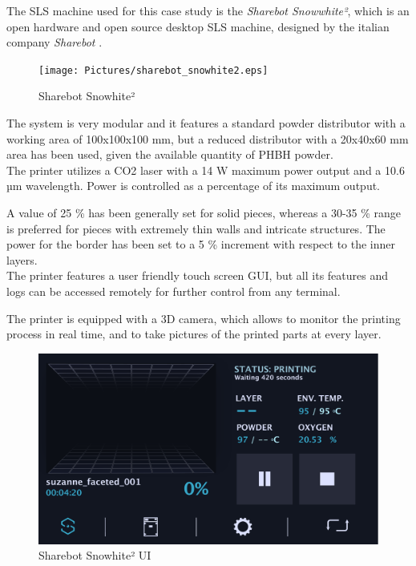 \documentclass{article}
\begin{document}
        The SLS machine used for this case study is the \textit{Sharebot Snowwhite²}, which is an open hardware and 
        open source desktop SLS machine, designed by the italian company \textit{Sharebot} \autocites{Sharebot}. \\ 

        \begin{figure}[h!]
            \centering
            \texttt{[image: Pictures/sharebot\_snowhite2.eps]}
            \caption{Sharebot Snowhite²}
            \label{fig:Sharebot_Snowhite2}
        \end{figure}

        The system is very modular and it features a standard powder distributor with a working area of 
        100x100x100 mm, but a reduced distributor with a 20x40x60 mm area has been used, given the available 
        quantity of PHBH powder.  \\ 

        The printer utilizes a CO2 laser with a 14 W maximum power output and a 10.6 µm wavelength. Power is controlled as 
        a percentage of its maximum output.  

        A value of 25 \% has been generally set for solid pieces, whereas a 30-35 \% range is preferred for pieces with extremely thin walls and intricate structures.  
        The power for the border has been set to a 5 \% increment with respect to the inner layers. \\ 

        The printer features a user friendly touch screen GUI, but all its features and logs can be accessed remotely for further control from any terminal.  

        The printer is equipped with a 3D camera, which allows to monitor the printing process in real time, 
        and to take pictures of the printed parts at every layer. \\

        \begin{figure}[h!]
            \centering
            \includegraphics[width=\textwidth]{Pictures/Sharebot_GUI.pdf}
            \caption{Sharebot Snowhite² UI}
            \label{fig:Sharebot_UI}
        \end{figure}
\end{document}
